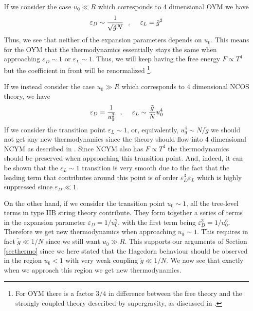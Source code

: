 \documentclass[a4paper,twoside,titlepage,12pt]{article}
\begin{document}
If we consider the case \( u_0 \ll R \) which corresponds to
4 dimensional OYM we have 
%
\begin{equation}
\varepsilon_D \sim \frac{1}{\sqrt{\tilde{g}N}} \ \ ,\ \ \ \ 
\varepsilon_L = \tilde{g}^2
\end{equation}
%
Thus, we see that neither of the expansion parameters depends on
\( u_0 \). This means for the OYM that the thermodynamics essentially
stays the same when approaching \( \varepsilon_D \sim 1 \) or
\( \varepsilon_L \sim 1 \). Thus, we will keep having 
the free energy \( F \propto T^4 \) but the coefficient in front
will be renormalized%
\footnote{For OYM there is a factor $3/4$
in difference between the free theory and the strongly coupled theory
described by supergravity, as discussed in \cite{Gubser:1998nz}.}.

If we instead consider the case \( u_0 \gg R \) which corresponds
to 4 dimensional NCOS theory, we have
%
\begin{equation}
\varepsilon_D = \frac{1}{u_0^2} \ \ ,\ \ \ \ 
\varepsilon_L \sim \frac{\tilde{g}}{N} u_0^4 
\end{equation}
%
If we consider the transition point \( \varepsilon_L \sim 1 \),
or, equivalently, \( u_0^4 \sim N/\tilde{g} \) we should not
get any new thermodynamics since the theory should flow into
4 dimensional NCYM as described in \cite{Ganor:2000my,Gopakumar:2000na}. 
Since NCYM also has
\( F \propto T^4 \) the thermodynamics should be preserved when
approaching this transition point. And, indeed, it can be shown 
\cite{Correia:2000} that the \( \varepsilon_L \sim 1 \) transition
is very smooth due to the fact that the leading term that
contributes around this point is of order 
\( \varepsilon_D^3 \varepsilon_L \) which is highly suppressed since
\( \varepsilon_D \ll 1 \).

On the other hand, if we consider the transition point 
\( u_0 \sim 1 \), all the tree-level terms in type IIB string theory
contribute. They form together a series of terms in the expansion
parameter \( \varepsilon_D = 1/u_0^2 \), with the first term being
\( \varepsilon_D^3 = 1/u_0^6 \).
Therefore we get new thermodynamics when approaching \( u_0 \sim 1 \).
This requires in fact \( \tilde{g} \ll 1/N \) since we still want
\( u_0 \gg R \). 
This supports our arguments of Section \ref{secthermo} since we here
stated that the Hagedorn behaviour should be observed in the region
\( u_0 < 1 \) with very weak coupling \( \tilde{g} \ll 1/N \).
We now see that exactly when we approach this region we get
new thermodynamics.
\end{document}
